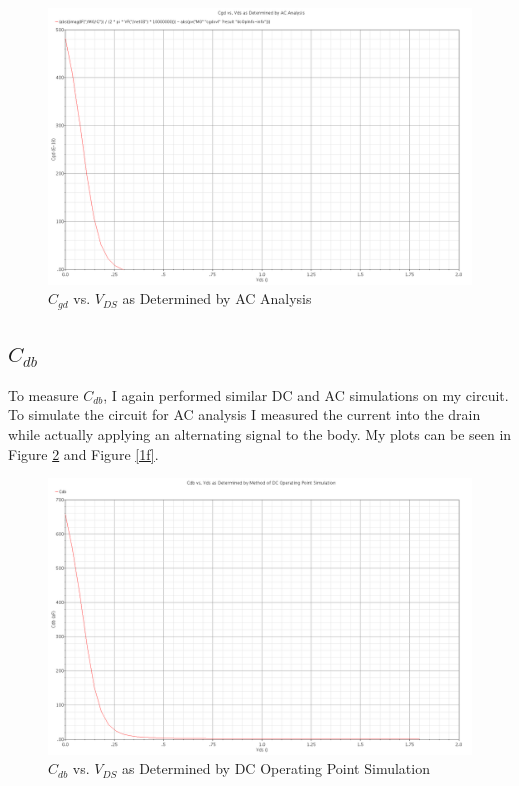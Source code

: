 \documentclass{article}
\begin{document}
\begin{figure}[H]
\centering
\includegraphics[width=5in]{1e.png}
\caption{$C_{gd}$ vs. $V_{DS}$ as Determined by AC Analysis}
\label{1e}
\end{figure}
\newpage

\subsection{$C_{db}$}
To measure $C_{db}$, I again performed similar DC and AC simulations on my circuit. To simulate the circuit for AC analysis I measured the current into the drain while actually applying an alternating signal to the body. My plots can be seen in Figure \ref{1c} and Figure \ref{1f}.

\begin{figure}[H]
\centering
\includegraphics[width=5in]{1c.png}
\caption{$C_{db}$ vs. $V_{DS}$ as Determined by DC Operating Point Simulation}
\label{1c}
\end{figure}
\end{document}
